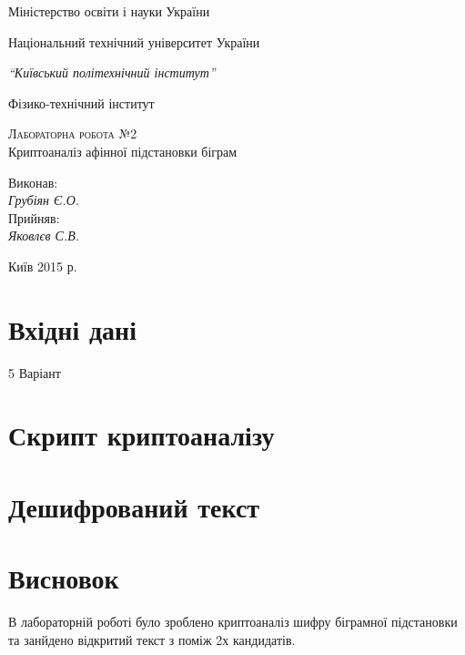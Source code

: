 \documentclass[a4paper,12pt]{article}
\begin{document}
\begin{titlepage}
  \begin{center}
    \large
    Міністерство освіти і науки України
    
    Національний технічний університет України

    \textit{“Київський політехнічний інститут”}
    
    Фізико-технічний інститут
    \vspace{5cm}

    \textsc{Лабораторна робота №2}\\[5mm]
    
    {\LARGE Криптоаналіз афінної підстановки біграм}\\
  \bigskip
    
    
\end{center}
\vspace{3cm}
\hfill
\begin{minipage}{0.3\textwidth}
\large
  Виконав:\\
  \textit{Грубіян Є.О.}\\
  Прийняв:\\
  \textit{Яковлєв С.В.}\\ %
  
\end{minipage}
\bigskip

\vfill
\vfill
\vfill
\begin{center}
  Київ 2015 р.
\end{center}

\end{titlepage}
\section*{Вхідні дані}

{\large 5 Варіант }

\section*{Скрипт криптоаналізу}


\newpage
\section*{Дешифрований текст}

\section*{Висновок}
В лабораторній роботі було зроблено криптоаналіз шифру біграмної підстановки та занйдено відкритий текст з поміж 2х кандидатів.
\end{document}
